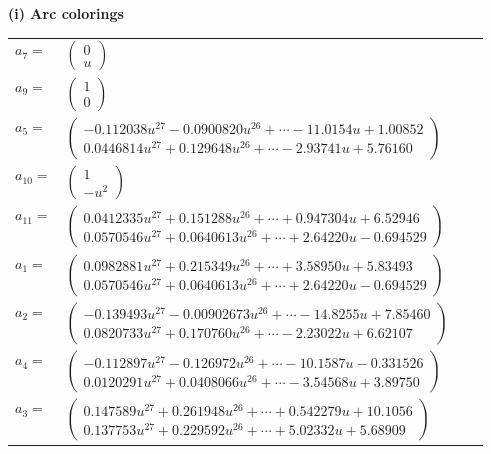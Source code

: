 \documentclass[1p]{elsarticle_modified}
\theoremstyle{definition}
\begin{document}
\flushleft \textbf{(i) Arc colorings}\\
\begin{tabular}{m{7pt} m{180pt} m{7pt} m{180pt} }
\flushright $a_{7}=$&$\begin{pmatrix}0\\u\end{pmatrix}$ \\
\flushright $a_{9}=$&$\begin{pmatrix}1\\0\end{pmatrix}$ \\
\flushright $a_{5}=$&$\begin{pmatrix}-0.112038 u^{27}-0.0900820 u^{26}+\cdots-11.0154 u+1.00852\\0.0446814 u^{27}+0.129648 u^{26}+\cdots-2.93741 u+5.76160\end{pmatrix}$ \\
\flushright $a_{10}=$&$\begin{pmatrix}1\\- u^2\end{pmatrix}$ \\
\flushright $a_{11}=$&$\begin{pmatrix}0.0412335 u^{27}+0.151288 u^{26}+\cdots+0.947304 u+6.52946\\0.0570546 u^{27}+0.0640613 u^{26}+\cdots+2.64220 u-0.694529\end{pmatrix}$ \\
\flushright $a_{1}=$&$\begin{pmatrix}0.0982881 u^{27}+0.215349 u^{26}+\cdots+3.58950 u+5.83493\\0.0570546 u^{27}+0.0640613 u^{26}+\cdots+2.64220 u-0.694529\end{pmatrix}$ \\
\flushright $a_{2}=$&$\begin{pmatrix}-0.139493 u^{27}-0.00902673 u^{26}+\cdots-14.8255 u+7.85460\\0.0820733 u^{27}+0.170760 u^{26}+\cdots-2.23022 u+6.62107\end{pmatrix}$ \\
\flushright $a_{4}=$&$\begin{pmatrix}-0.112897 u^{27}-0.126972 u^{26}+\cdots-10.1587 u-0.331526\\0.0120291 u^{27}+0.0408066 u^{26}+\cdots-3.54568 u+3.89750\end{pmatrix}$ \\
\flushright $a_{3}=$&$\begin{pmatrix}0.147589 u^{27}+0.261948 u^{26}+\cdots+0.542279 u+10.1056\\0.137753 u^{27}+0.229592 u^{26}+\cdots+5.02332 u+5.68909\end{pmatrix}$ \\

\end{tabular}
\end{document}
